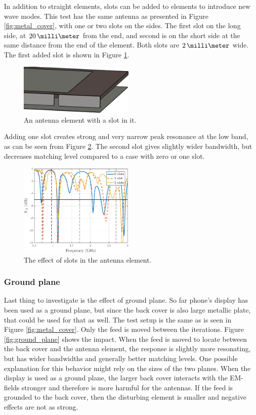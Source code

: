 In addition to straight elements, slots can be added to elements to introduce new wave modes. This test has the same antenna as presented in Figure \ref{fig:metal_cover}, with one or two slots on the sides. The first slot on the long side, at $20\,\milli\meter$ from the end, and second is on the short side at the same distance from the end of the element. Both slots are $2\,\milli\meter$ wide. The first added slot is shown in Figure \ref{fig:slot}.
\begin{figure}[H]
    \centering
    \includegraphics[width=0.5\textwidth]{img/slot.eps}
    \caption{An antenna element with a slot in it.}
    \label{fig:slot}
\end{figure}

Adding one slot creates strong and very narrow peak resonance at the low band, as can be seen from Figure \ref{fig:slot_res}. The second slot gives slightly wider bandwidth, but decreases matching level compared to a case with  zero or one slot.

\begin{figure}[H]
    \centering
    \includegraphics[width=0.5\textwidth]{img/slot_res.eps}
    \caption{The effect of slots in the antenna element.}
    \label{fig:slot_res}
\end{figure}

\subsubsection{Ground plane}
\label{sec:ground_plane}
Last thing to investigate is the effect of ground plane. So far phone's display has been used as a ground plane, but since the back cover is also large metallic plate, that could be used for that as well. The test setup is the same as is seen in Figure \ref{fig:metal_cover}. Only the feed is moved between the iterations. Figure \ref{fig:ground_plane} shows the impact. When the feed is moved to locate between the back cover and the antenna element, the response is slightly more resonating, but has wider bandwidths and generally better matching levels. One possible explanation for this behavior might rely on the sizes of the two planes. When the display is used as a ground plane, the larger back cover interacts with the EM-fields stronger and therefore is more harmful for the antennas. If the feed is grounded to the back cover, then the disturbing element is smaller and negative effects are not as strong.

